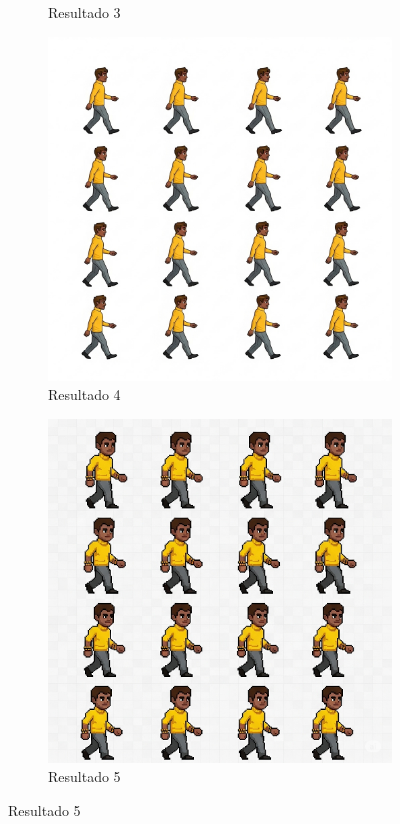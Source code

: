 \begin{figure}[htbp]
\begin{subfigure}{0.3\linewidth}
        \caption{\small Resultado 3}
        \label{fig:geminiProSheet1c}
    \end{subfigure}
    \begin{subfigure}{0.3\linewidth}
        \includegraphics[width=1\linewidth]{figs/geminiPro/chat8/tela1_res4.PNG}
        \caption{\small Resultado 4}
        \label{fig:geminiProSheet1d}
    \end{subfigure}
    \begin{subfigure}{0.3\linewidth}
        \includegraphics[width=1\linewidth]{figs/geminiPro/chat8/tela1_res5.PNG}
        \caption{\small Resultado 5}
        \label{fig:geminiProSheet1e}
    \end{subfigure}
\end{figure}

